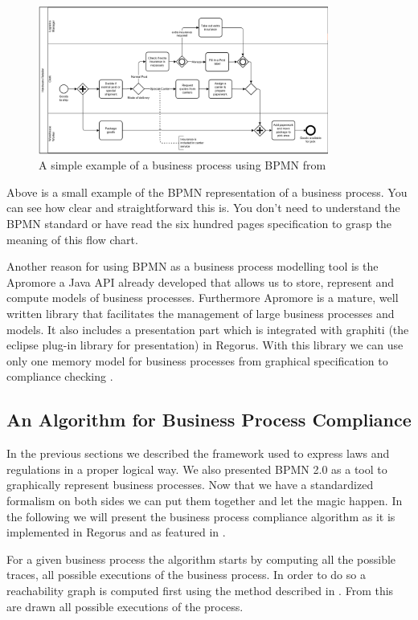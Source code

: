 \documentclass[10pt]{report}
\begin{document}
\begin{figure}[h!]
\centering
\includegraphics[width=0.85\textwidth]{BPMNex.png}
\caption{A simple example of a business process using BPMN from \autocite{BPMNexample}}
\end{figure}

Above is a small example of the BPMN representation of a business process. You can see how clear and straightforward this is. You don't need to understand the BPMN standard or have read the six hundred pages specification to grasp the meaning of this flow chart.

Another reason for using BPMN as a business process modelling tool is the Apromore a Java API already developed that allows us to store, represent and compute models of business processes. Furthermore Apromore is a mature, well written library that facilitates the management of large business processes and models. It also includes a presentation part which is integrated with graphiti (the eclipse plug-in library for presentation) in Regorus. With this library we can use only one memory model for business processes from graphical specification to compliance checking \autocite{ApromoreWebsite}.



\subsection{An Algorithm for Business Process Compliance}
In the previous sections we described the framework used to express laws and regulations in a proper logical way. We also presented BPMN 2.0 as a tool to graphically represent business processes. Now that we have a standardized formalism on both sides we can put them together and let the magic happen. In the following we will present the business process compliance algorithm as it is implemented in Regorus and as featured in \autocite{ConceptuallyRichModelofBPC}.

For a given business process the algorithm starts by computing all the possible traces, all possible executions of the business process. In order to do so a reachability graph is computed first using the method described in \autocite{sweepline2004}. From this are drawn all possible executions of the process. 
\end{document}
